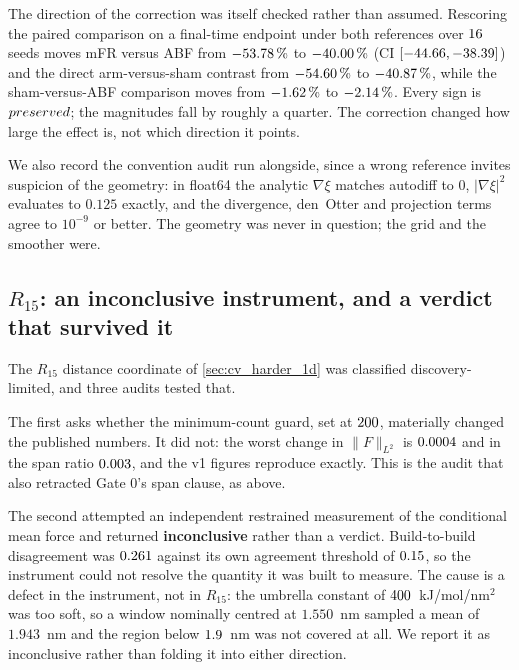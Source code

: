 The direction of the correction was itself checked rather than assumed. Rescoring the paired
comparison on a final-time endpoint under both references over $16$ seeds moves mFR versus
ABF from $-53.78\,\%$ to $-40.00\,\%$ (CI $[-44.66, -38.39]$) and the direct
arm-versus-sham contrast from $-54.60\,\%$ to $-40.87\,\%$, while the sham-versus-ABF
comparison moves from $-1.62\,\%$ to $-2.14\,\%$. Every sign is $preserved$; the
magnitudes fall by roughly a quarter. The correction changed how large the effect is, not which
direction it points.

We also record the convention audit run alongside, since a wrong reference invites suspicion of
the geometry: in float64 the analytic $\nabla \xi$ matches autodiff to $0$, $|\nabla \xi|^2$
evaluates to $0.125$ exactly, and the divergence, den~Otter and projection terms agree to
$10^{-9}$ or better. The geometry was never in question; the grid and the smoother were.

\subsection{$R_{15}$: an inconclusive instrument, and a verdict that survived it}
\label{sec:r15_audits}

The $R_{15}$ distance coordinate of \cref{sec:cv_harder_1d} was classified discovery-limited, and three
audits tested that.

The first asks whether the minimum-count guard, set at $200$, materially changed the
published numbers. It did not: the worst change in $\|F\|_{L^2}$ is $0.0004$ and in the
span ratio $0.003$, and the v1 figures reproduce exactly. This is the audit that also
retracted Gate 0's span clause, as above.

The second attempted an independent restrained measurement of the conditional mean force and
returned \textbf{inconclusive} rather than a verdict. Build-to-build disagreement was
$0.261$ against its own agreement threshold of $0.15$, so the
instrument could not resolve the quantity it was built to measure. The cause is a defect in the
instrument, not in $R_{15}$: the umbrella constant of $400$~kJ/mol/nm$^2$ was too
soft, so a window nominally centred at $1.550$~nm sampled a mean of $1.943$~nm and the region
below $1.9$~nm was not covered at all. We report it as inconclusive rather than folding
it into either direction.

